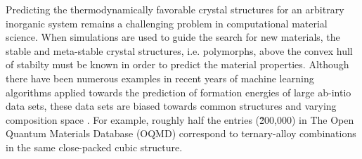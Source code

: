 

Predicting the thermodynamically favorable crystal structures for an arbitrary inorganic system remains a challenging problem in computational material science.\cite{}
%
%
When simulations are used to guide the search for new materials, the stable and meta-stable crystal structures, i.e. polymorphs,  above the convex hull of stabilty  must be known in order to predict the material properties.\cite{}
Although there have been numerous examples in recent years of machine learning algorithms applied towards the prediction of formation energies of large ab-intio data sets, these data sets are biased towards common structures and varying composition space .\cite{}
%
For example, roughly half the entries (\~200,000) in The Open Quantum Materials Database (OQMD) correspond to ternary-alloy combinations in the same close-packed cubic structure.
